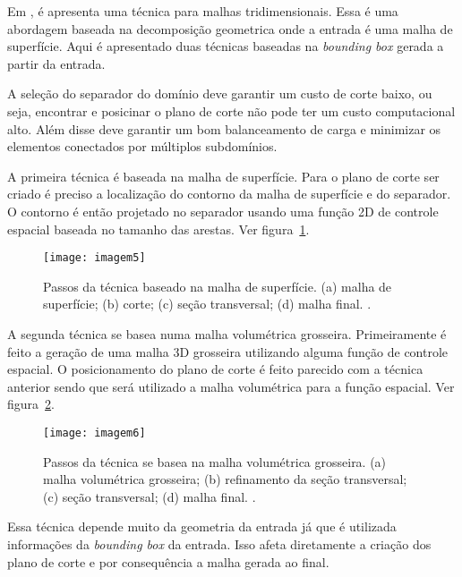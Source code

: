 Em \cite{bib:Glut08}, é apresenta uma técnica para malhas tridimensionais. Essa é uma abordagem baseada na decomposição geometrica onde a entrada é uma malha de superfície. Aqui é apresentado duas técnicas baseadas na \textit{bounding box} gerada a partir da entrada.

A seleção do separador do domínio deve garantir um custo de corte baixo, ou seja, encontrar e posicinar o plano de corte não pode ter um custo computacional alto. Além disse deve garantir um bom balanceamento de carga e minimizar os elementos conectados por múltiplos subdomínios.

A primeira técnica é baseada na malha de superfície. Para o plano de corte ser criado é preciso a localização do contorno da malha de superfície e do separador. O contorno é então projetado no separador usando uma função 2D de controle espacial baseada no tamanho das arestas. Ver figura~\ref{fig:imagem5}.

 \begin{figure}[htbp]
     \centering
     \texttt{[image: imagem5]}
     \caption{Passos da técnica baseado na malha de superfície. (a) malha de superfície; (b) corte; (c) seção transversal; (d) malha final. \cite{bib:Glut08}.}
     \label{fig:imagem5}
 \end{figure}

A segunda técnica se basea numa malha volumétrica grosseira. Primeiramente é feito a geração de uma malha 3D grosseira utilizando alguma função de controle espacial. O posicionamento do plano de corte é feito parecido com a técnica anterior sendo que será utilizado a malha volumétrica para a função espacial. Ver figura~\ref{fig:imagem6}.

 \begin{figure}[htbp]
     \centering
     \texttt{[image: imagem6]}
     \caption{Passos da técnica se basea na malha volumétrica grosseira. (a) malha volumétrica grosseira; (b) refinamento da seção transversal; (c) seção transversal; (d) malha final. \cite{bib:Glut08}.}
     \label{fig:imagem6}
 \end{figure}

Essa técnica depende muito da geometria da entrada já que é utilizada informações da \textit{bounding box} da entrada. Isso afeta diretamente a criação dos plano de corte e por consequência a malha gerada ao final.



